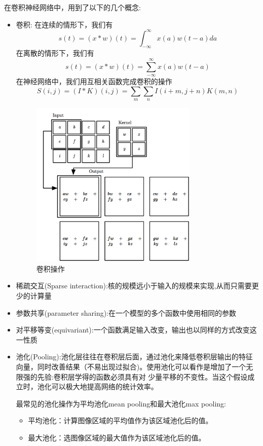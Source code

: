 \documentclass[11pt]{article}
\begin{document}
			在卷积神经网络中，用到了以下的几个概念:
			\begin{itemize}
				\item 卷积: 
				在连续的情形下，我们有
				\[s(t) = (x*w)(t) = \int^{\infty}_{-\infty} x(a)w(t-a)da\]
				在离散的情形下，我们有
				\[s(t) = (x*w)(t) = \sum_{-\infty}^{\infty} x(a)w(t-a)\]
				在神经网络中，我们用互相关函数完成卷积的操作
				\[S(i, j) = (I*K)(i, j) = \sum_m \sum_n I(i + m, j + n)K(m, n)\]
				\begin{figure}[H]
        			\begin{center}
        				\includegraphics[width=8cm]{./imgs/conv.png}
        				\caption{卷积操作}
        			\end{center}
    			\end{figure}
    			\item 稀疏交互(Sparse interaction):核的规模远小于输入的规模来实现,从而只需要更少的计算量
    			\item 参数共享(parameter sharing):在一个模型的多个函数中使用相同的参数
    			\item 对平移等变(equivariant):一个函数满足输入改变，输出也以同样的方式改变这一性质
    			\item 池化(Pooling):池化层往往在卷积层后面，通过池化来降低卷积层输出的特征向量，同时改善结果（不易出现过拟合)。使用池化可以看作是增加了一个无限强的先验:卷积层学得的函数必须具有对 少量平移的不变性。当这个假设成立时，池化可以极大地提高网络的统计效率。
    			 
    			最常见的池化操作为平均池化mean pooling和最大池化max pooling:
    			\begin{itemize}
    				\item 平均池化：计算图像区域的平均值作为该区域池化后的值。
					\item 最大池化：选图像区域的最大值作为该区域池化后的值。
				\end{itemize}
    		
			\end{itemize}
\end{document}
